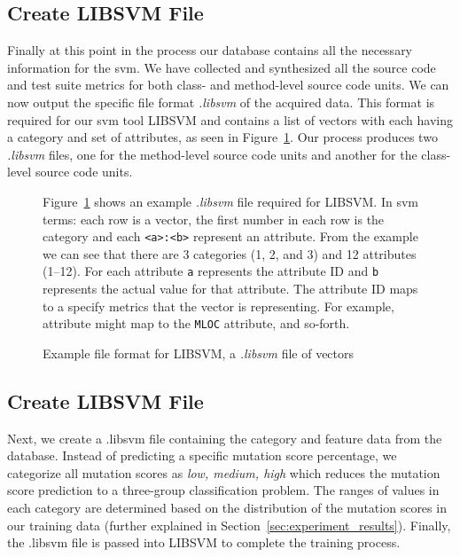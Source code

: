 \subsection{Create LIBSVM File}
\label{subsec:approach_create_libsvm_file}
Finally at this point in the process our database contains all the necessary information for the \gls{svm}. We have collected and synthesized all the source code and test suite metrics for both class- and method-level source code units. We can now output the specific file format \emph{.libsvm} of the acquired data. This format is required for our \gls{svm} tool LIBSVM and contains a list of vectors with each having a category and set of attributes, as seen in Figure~\ref{fig:libsvm_file}. Our process produces two \emph{.libsvm} files, one for the method-level source code units and another for the class-level source code units.

\begin{figure}[h]
  \centering
  \begin{minipage}{9.5cm}
    
  \end{minipage}
  \caption{Example file format for LIBSVM, a \emph{.libsvm} file of vectors}
  \vspace{1mm}
  \footnotesize{Figure~\ref{fig:libsvm_file} shows an example \emph{.libsvm} file required for LIBSVM. In \gls{svm} terms: each row is a vector, the first number in each row is the category and each \texttt{<a>:<b>} represent an attribute. From the example we can see that there are 3 categories (1, 2, and 3) and 12 attributes (1--12). For each attribute \texttt{a} represents the attribute ID and \texttt{b} represents the actual value for that attribute. The attribute ID maps to a specify metrics that the vector is representing. For example, attribute  might map to the \texttt{MLOC} attribute, and so-forth.}
  \vspace{1mm}
  \label{fig:libsvm_file}
\end{figure}


\subsection{Create LIBSVM File}
\label{subsec:approach_create_libsvm_file}
Next, we create a .libsvm file containing the category and feature data from the database. Instead of predicting a specific mutation score percentage, we categorize all mutation scores as \textit{low, medium, high} which reduces the mutation score prediction to a three-group classification problem. The ranges of values in each category are determined based on the distribution of the mutation scores in our training data (further explained in Section~\ref{sec:experiment_results}). Finally, the .libsvm file is passed into LIBSVM to complete the training process.

